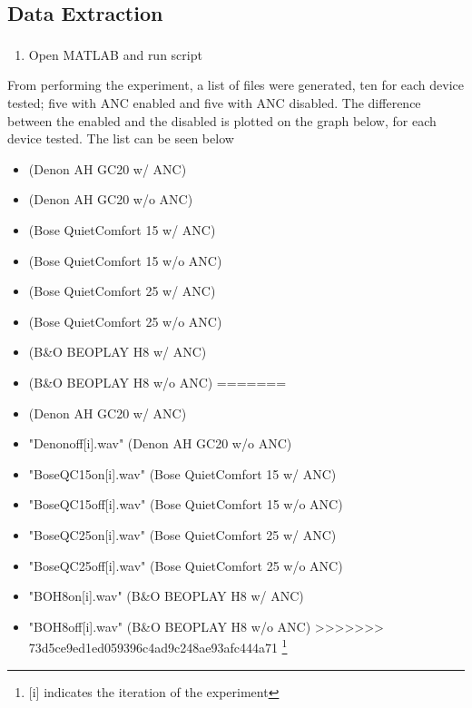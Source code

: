 		
\subsection{Data Extraction}
\begin{enumerate}
	\item Open MATLAB\textsuperscript{\textregistered} and run script 
\end{enumerate}

From performing the experiment, a list of files were generated, ten for each device tested; five with ANC enabled and five with ANC disabled.
The difference between the enabled and the disabled is plotted on the graph below, for each device tested. The list can be seen below

\begin{itemize}
<<<<<<< HEAD
	\item {}			(Denon AH GC20 w/ ANC)
	\item {}		(Denon AH GC20 w/o ANC)
	\item {}		(Bose QuietComfort 15 w/ ANC)
	\item {}		(Bose QuietComfort 15 w/o ANC)
	\item {}		(Bose QuietComfort 25 w/ ANC)
	\item {}		(Bose QuietComfort 25 w/o ANC)
	\item {}			(B\&O BEOPLAY H8 w/ ANC)
	\item {}			(B\&O BEOPLAY H8 w/o ANC)
=======
	\item {}		(Denon AH GC20 w/ ANC)
	\item "Denonoff[i].wav"		(Denon AH GC20 w/o ANC)
	\item "BoseQC15on[i].wav"		(Bose QuietComfort 15 w/ ANC)
	\item "BoseQC15off[i].wav"		(Bose QuietComfort 15 w/o ANC)
	\item "BoseQC25on[i].wav"		(Bose QuietComfort 25 w/ ANC)
	\item "BoseQC25off[i].wav"		(Bose QuietComfort 25 w/o ANC)
	\item "BOH8on[i].wav"			(B\&O BEOPLAY H8 w/ ANC)
	\item "BOH8off[i].wav"		(B\&O BEOPLAY H8 w/o ANC)
>>>>>>> 73d5ce9ed1ed059396c4ad9c248ae93afc444a71
	\footnote{[i] indicates the iteration of the experiment}
\end{itemize}


